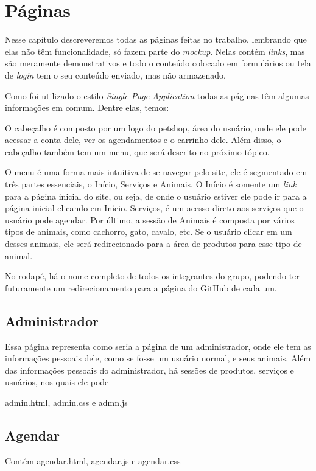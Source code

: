 \chapter{Páginas}
Nesse capítulo descreveremos todas as páginas feitas no trabalho, lembrando
que elas não têm funcionalidade, só fazem parte do \emph{mockup}. Nelas contém
\emph{links}, mas são meramente demonstrativos e todo o conteúdo colocado em
formulários ou tela de \emph{login} tem o seu conteúdo enviado, mas não
armazenado.

Como foi utilizado o estilo \emph{Single-Page Application} todas as páginas têm
algumas informações em comum. Dentre elas, temos:
\begin{description}[style=nextline]
	\item [Cabeçalho]	O cabeçalho é composto por um logo do petshop, área do
						usuário, onde ele pode acessar a conta dele, ver os
						agendamentos e o carrinho dele. Além disso, o cabeçalho
						também tem um menu, que será descrito no próximo tópico.
	\item [Menu]		O menu é uma forma mais intuitiva de se navegar pelo site,
						ele é segmentado em três partes essenciais, o Início,
						Serviços e Animais. O Início é somente um \emph{link} para
						a página inicial do site, ou seja, de onde o usuário estiver
						ele pode ir para a página inicial clicando em Início.
						Serviços, é um acesso direto aos serviços que o usuário pode
						agendar. Por último, a sessão de Animais é composta por
						vários tipos de animais, como cachorro, gato, cavalo, etc.
						Se o usuário clicar em um desses animais, ele será
						redirecionado para a área de produtos para esse tipo de animal.
	\item [Rodapé]		No rodapé, há o nome completo de todos os integrantes do grupo,
						podendo ter futuramente um redirecionamento para a página do
						GitHub de cada um.
\end{description}

\section{Administrador}
Essa página representa como seria a página de um administrador, onde ele tem
as informações pessoais dele, como se fosse um usuário normal, e seus animais.
Além das informações pessoais do administrador, há sessões de produtos,
serviços e usuários, nos quais ele pode


admin.html, admin.css e admn.js
\section{Agendar}
Contém agendar.html, agendar.js e agendar.css
